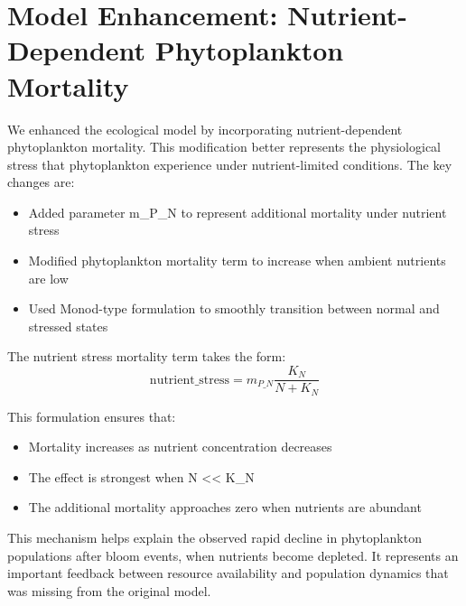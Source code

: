 \section{Model Enhancement: Nutrient-Dependent Phytoplankton Mortality}

We enhanced the ecological model by incorporating nutrient-dependent phytoplankton mortality. This modification better represents the physiological stress that phytoplankton experience under nutrient-limited conditions. The key changes are:

\begin{itemize}
    \item Added parameter m\_P\_N to represent additional mortality under nutrient stress
    \item Modified phytoplankton mortality term to increase when ambient nutrients are low
    \item Used Monod-type formulation to smoothly transition between normal and stressed states
\end{itemize}

The nutrient stress mortality term takes the form:
\[ \text{nutrient\_stress} = m_{P\_N} \frac{K_N}{N + K_N} \]

This formulation ensures that:
\begin{itemize}
    \item Mortality increases as nutrient concentration decreases
    \item The effect is strongest when N << K_N
    \item The additional mortality approaches zero when nutrients are abundant
\end{itemize}

This mechanism helps explain the observed rapid decline in phytoplankton populations after bloom events, when nutrients become depleted. It represents an important feedback between resource availability and population dynamics that was missing from the original model.
